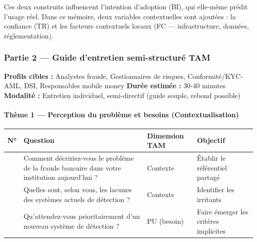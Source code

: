 \documentclass[
  12pt,
]{article}
\newcounter{none} %
\begin{document}
Ces deux construits influencent l’intention d’adoption (BI), qui
elle-même prédit l’usage réel. Dans ce mémoire, deux variables
contextuelles sont ajoutées : la confiance (TR) et les facteurs
contextuels locaux (FC — infrastructure, données, réglementation).

\subsubsection{Partie 2 — Guide d’entretien semi-structuré
TAM}\label{partie-2-guide-dentretien-semi-structuruxe9-tam}

\textbf{Profils cibles :} Analystes fraude, Gestionnaires de risques,
Conformité/KYC-AML, DSI, Responsables mobile money \textbf{Durée estimée
:} 30-40 minutes \textbf{Modalité :} Entretien individuel, semi-directif
(guide souple, rebond possible)

\paragraph{Thème 1 — Perception du problème et besoins
(Contextualisation)}\label{thuxe8me-1-perception-du-probluxe8me-et-besoins-contextualisation}

{\def\LTcaptype{none} %
\begin{longtable}[]{@{}
  >{\raggedright\arraybackslash}p{}
  >{\raggedright\arraybackslash}p{}
  >{\raggedright\arraybackslash}p{}
  >{\raggedright\arraybackslash}p{}@{}}
\toprule\noalign{}
\begin{minipage}[b]{\linewidth}\raggedright
N°
\end{minipage} & \begin{minipage}[b]{\linewidth}\raggedright
Question
\end{minipage} & \begin{minipage}[b]{\linewidth}\raggedright
Dimension TAM
\end{minipage} & \begin{minipage}[b]{\linewidth}\raggedright
Objectif
\end{minipage} \\
\midrule\noalign{}
\endhead
\bottomrule\noalign{}
\endlastfoot
1 & Comment décririez-vous le problème de la fraude bancaire dans votre
institution aujourd’hui ? & Contexte & Établir le référentiel partagé \\
2 & Quelles sont, selon vous, les lacunes des systèmes actuels de
détection ? & Contexte & Identifier les irritants \\
3 & Qu’attendez-vous prioritairement d’un nouveau système de détection ?
& PU (besoin) & Faire émerger les critères implicites \\
\end{longtable}
}
\end{document}
